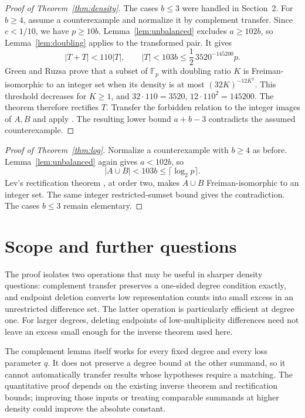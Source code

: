 \documentclass[11pt]{article}
\theoremstyle{remark}
\newcommand{\F}{\mathbb F}
\begin{document}
\begin{proof}[Proof of Theorem~\ref{thm:density}]
The cases $b\le3$ were handled in Section~2. For $b\ge4$, assume a counterexample and normalize it by complement transfer. Since $c<1/10$, we have $p\ge10b$. Lemma~\ref{lem:unbalanced} excludes $a\ge102b$, so Lemma~\ref{lem:doubling} applies to the transformed pair. It gives
\[
 |T+T|<110|T|,\qquad
 |T|<103b\le\frac12\,3520^{-145200}p.
\]
Green and Ruzsa \cite[Theorem~1.3]{GR} prove that a subset of $\F_p$ with doubling ratio $K$ is Freiman-isomorphic to an integer set when its density is at most $(32K)^{-12K^2}$. This threshold decreases for $K\ge1$, and $32\cdot110=3520$, $12\cdot110^2=145200$. The theorem therefore rectifies $T$. Transfer the forbidden relation to the integer images of $A,B$ and apply \cite[Theorem~1.5(i)]{Ouyang}. The resulting lower bound $a+b-3$ contradicts the assumed counterexample.
\end{proof}

\begin{proof}[Proof of Theorem~\ref{thm:log}]
Normalize a counterexample with $b\ge4$ as before. Lemma~\ref{lem:unbalanced} again gives $a<102b$, so
\[
 |A\cup B|<103b\le\lceil\log_2p\rceil.
\]
Lev's rectification theorem \cite[Theorem~1]{Lev2008}, at order two, makes $A\cup B$ Freiman-isomorphic to an integer set. The same integer restricted-sumset bound gives the contradiction. The cases $b\le3$ remain elementary.
\end{proof}

\section{Scope and further questions}
The proof isolates two operations that may be useful in sharper density questions: complement transfer preserves a one-sided degree condition exactly, and endpoint deletion converts low representation counts into small excess in an unrestricted difference set. The latter operation is particularly efficient at degree one. For larger degrees, deleting endpoints of low-multiplicity differences need not leave an excess small enough for the inverse theorem used here.

The complement lemma itself works for every fixed degree and every loss parameter $q$. It does not preserve a degree bound at the other summand, so it cannot automatically transfer results whose hypotheses require a matching. The quantitative proof depends on the existing inverse theorem and rectification bounds; improving those inputs or treating comparable summands at higher density could improve the absolute constant.
\end{document}
